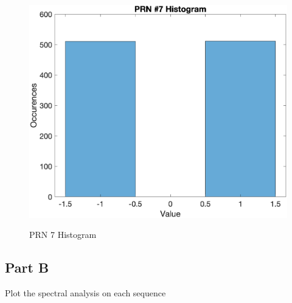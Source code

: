 \documentclass{article}
\begin{document}
\begin{figure}[H]
    \centering
    \includegraphics[width=0.75\linewidth]{../figures/p8_prn7_hist.png}\label{fig:p8_prn7_hist}
    \caption{PRN 7 Histogram }
\end{figure}

\subsection*{Part B}
Plot the spectral analysis on each sequence
\end{document}
